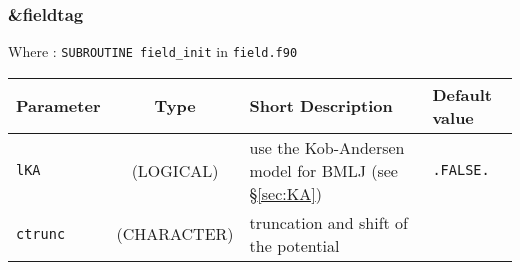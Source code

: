 \documentclass[a4paper,8pt]{article}
\begin{document}

\subsubsection{\&fieldtag}

Where : \verb?SUBROUTINE field_init? in \verb?field.f90?
\newline

\begin{longtable}{l|c|m{8cm}|m{2cm}}
\hline
\hline
Parameter        &  Type              &          Short Description                                                          & Default value \\
\hline
\hline
\rule[-0.75cm]{0cm}{1.5cm}
\verb?lKA?       &  (LOGICAL)         & use the Kob-Andersen model for BMLJ (see \S \ref{sec:KA})                           & \verb?.FALSE.? \\
\hline
\rule[-0.75cm]{0cm}{1.5cm}
\verb?ctrunc?    &  (CHARACTER)       & \newline truncation and shift of the potential \newline 


\end{longtable}
\end{document}

